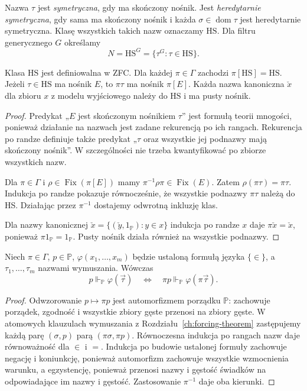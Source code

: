 \begin{definicja}
\label{def:sym36-hs}
Nazwa $\tau$ jest \emph{symetryczna}, gdy ma skończony
nośnik. Jest \emph{heredytarnie symetryczna},
gdy sama ma skończony nośnik i każda
$\sigma\in\operatorname{dom}\tau$ jest
heredytarnie symetryczna.
Klasę wszystkich takich nazw oznaczamy
$\mathrm{HS}$. Dla filtru generycznego $G$
określamy
\[
 N=\mathrm{HS}^G
   =\{\tau^G:\tau\in\mathrm{HS}\}.
\]
\end{definicja}

\begin{lemat}
\label{lem:sym36-hs-invariant}
Klasa $\mathrm{HS}$ jest definiowalna w ZFC.
Dla każdej $\pi\in\Gamma$ zachodzi
$\pi[\mathrm{HS}]=\mathrm{HS}$.
Jeżeli $\tau\in\mathrm{HS}$ ma nośnik $E$,
to $\pi\tau$ ma nośnik $\pi[E]$.
Każda nazwa kanoniczna $\check x$
dla zbioru $x$ z modelu wyjściowego
należy do $\mathrm{HS}$ i ma pusty nośnik.
\end{lemat}
\begin{proof}
Predykat „$E$ jest skończonym nośnikiem $\tau$”
jest formułą teorii mnogości, ponieważ
działanie na nazwach jest zadane
rekurencją po ich rangach.
Rekurencja po randze definiuje także predykat
„$\tau$ oraz wszystkie jej podnazwy
mają skończony nośnik”.
W szczególności nie trzeba kwantyfikować
po zbiorze wszystkich nazw.

Dla $\pi\in\Gamma$ i $\rho\in\operatorname{Fix}(\pi[E])$
mamy $\pi^{-1}\rho\pi\in\operatorname{Fix}(E)$.
Zatem $\rho(\pi\tau)=\pi\tau$.
Indukcja po randze pokazuje równocześnie,
że wszystkie podnazwy $\pi\tau$ należą do HS.
Działając przez $\pi^{-1}$ dostajemy
odwrotną inkluzję klas.

Dla nazwy kanonicznej
$\check x=\{(\check y,1_{\mathbb P}):y\in x\}$
indukcja po randze $x$ daje
$\pi\check x=\check x$, ponieważ
$\pi1_{\mathbb P}=1_{\mathbb P}$.
Pusty nośnik działa również na wszystkie podnazwy.
\end{proof}

\begin{lemat}
\label{lem:sym36-symmetry}
Niech $\pi\in\Gamma$, $p\in\mathbb P$,
$\varphi(x_1,\ldots,x_m)$ będzie ustaloną formułą
języka $\{\in\}$, a $\tau_1,\ldots,\tau_m$
nazwami wymuszania. Wówczas
\[
 p\Vdash_{\mathbb P}\varphi(\vec\tau)
 \quad\Longleftrightarrow\quad
 \pi p\Vdash_{\mathbb P}\varphi(\pi\vec\tau).
\]
\end{lemat}
\begin{proof}
Odwzorowanie $p\mapsto\pi p$
jest automorfizmem porządku $\mathbb P$:
zachowuje porządek, zgodność i wszystkie
zbiory gęste przenosi na zbiory gęste.
W atomowych klauzulach wymuszania
z Rozdziału~\ref{ch:forcing-theorem}
zastępujemy każdą parę $(\sigma,p)$
parą $(\pi\sigma,\pi p)$.
Równoczesna indukcja po rangach nazw
daje równoważność dla $\in$ i $=$.
Indukcja po budowie ustalonej formuły
zachowuje negację i koniunkcję,
ponieważ automorfizm zachowuje wszystkie
wzmocnienia warunku, a egzystencję,
ponieważ przenosi nazwy i gęstość
świadków na odpowiadające im nazwy i gęstość.
Zastosowanie $\pi^{-1}$ daje oba kierunki.
\end{proof}

